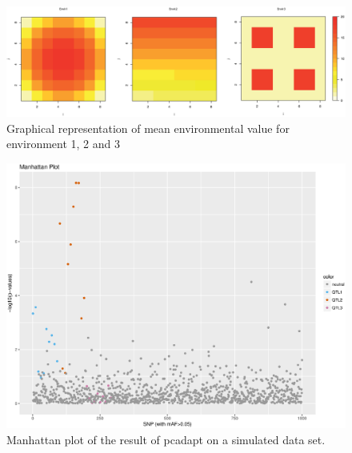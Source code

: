 \documentclass[nogrid]{MBE}%
\begin{document}
\begin{figure}[t]
\begin{center}
\includegraphics[height=0.25\textheight]{figures/simulatedenvironment.eps}
\end{center}
\caption{Graphical representation of mean environmental value for environment 1, 2 and 3}%
\label{fig:simulatedenvir}%
\end{figure}



\begin{figure}[t]
\begin{center}
\includegraphics[height=0.21\textheight]{figures/sim105_pcadapt.eps}
\end{center}
\caption{Manhattan plot of the result of pcadapt on a simulated data set.}%
\label{fig:pcadapt}%
\end{figure}
\end{document}
